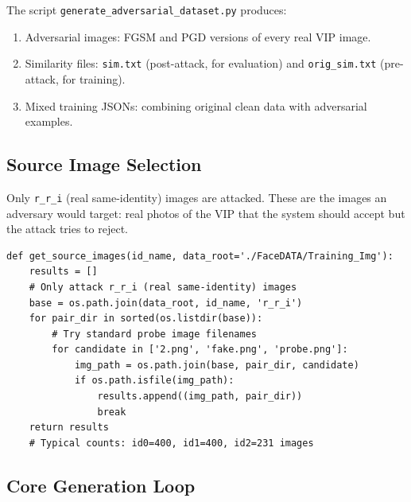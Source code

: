 \documentclass[12pt,a4paper]{article}
\begin{document}
The script \texttt{generate\_adversarial\_dataset.py} produces:
\begin{enumerate}
    \item Adversarial images: FGSM and PGD versions of every real VIP image.
    \item Similarity files: \texttt{sim.txt} (post-attack, for evaluation) and \texttt{orig\_sim.txt} (pre-attack, for training).
    \item Mixed training JSONs: combining original clean data with adversarial examples.
\end{enumerate}

\subsection{Source Image Selection}

Only \texttt{r\_r\_i} (real same-identity) images are attacked. These are the images an adversary would target: real photos of the VIP that the system should accept but the attack tries to reject.

\begin{lstlisting}[caption={Source image enumeration}]
def get_source_images(id_name, data_root='./FaceDATA/Training_Img'):
    results = []
    # Only attack r_r_i (real same-identity) images
    base = os.path.join(data_root, id_name, 'r_r_i')
    for pair_dir in sorted(os.listdir(base)):
        # Try standard probe image filenames
        for candidate in ['2.png', 'fake.png', 'probe.png']:
            img_path = os.path.join(base, pair_dir, candidate)
            if os.path.isfile(img_path):
                results.append((img_path, pair_dir))
                break
    return results
    # Typical counts: id0=400, id1=400, id2=231 images
\end{lstlisting}

\subsection{Core Generation Loop}
\end{document}
